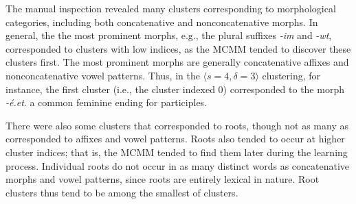 The manual inspection revealed many clusters corresponding to morphological categories, including 
both concatenative and nonconcatenative morphs. In general, the the most prominent morphs, e.g., the plural
suffixes \textit{-im}
and \textit{-wt}, corresponded to clusters with low indices, as the MCMM tended to discover these clusters first. The most 
prominent morphs are generally concatenative affixes and nonconcatenative vowel patterns. Thus, in the 
$\langle{s}=4,\delta=3\rangle$ clustering, for instance, the first cluster (i.e., the cluster indexed 0) corresponded to the morph \textit{-\'{e}.et}.
a common feminine ending for participles.

There were also some clusters that corresponded to roots, though not
as many as corresponded to affixes and vowel patterns. 
Roots also tended to occur at higher cluster indices; that is, the 
MCMM tended to find them later during the learning process. 
Individual roots do not occur in as many distinct words
as concatenative morphs and vowel patterns, since roots are entirely 
lexical in nature. Root clusters thus tend to be among the smallest of clusters.

